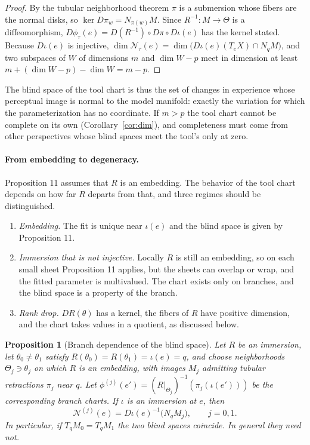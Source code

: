 \documentclass[11pt]{article}
\newtheorem{proposition}{Proposition}
\theoremstyle{remark}
\newcommand{\N}{\mathcal{N}}
\begin{document}
\begin{proof}
By the tubular neighborhood theorem $\pi$ is a submersion whose fibers are the normal disks, so $\ker D\pi_w=N_{\pi(w)}M$. Since $R^{-1}:M\to\Theta$ is a diffeomorphism, $D\phi_\tau(e)=D(R^{-1})\circ D\pi\circ D\iota(e)$ has the kernel stated. Because $D\iota(e)$ is injective, $\dim\N_\tau(e)=\dim\bigl(D\iota(e)(T_eX)\cap N_qM\bigr)$, and two subspaces of $W$ of dimensions $m$ and $\dim W-p$ meet in dimension at least $m+(\dim W-p)-\dim W=m-p$.
\end{proof}

The blind space of the tool chart is thus the set of changes in experience whose perceptual image is normal to the model manifold: exactly the variation for which the parameterization has no coordinate. If $m>p$ the tool chart cannot be complete on its own (Corollary~\ref{cor:dim}), and completeness must come from other perspectives whose blind spaces meet the tool's only at zero.

\paragraph{From embedding to degeneracy.} Proposition 11 assumes that $R$ is an embedding. The behavior of the tool chart depends on how far $R$ departs from that, and three regimes should be distinguished.
\begin{enumerate}[label=(\arabic*),nosep]
\item \emph{Embedding.} The fit is unique near $\iota(e)$ and the blind space is given by Proposition 11.
\item \emph{Immersion that is not injective.} Locally $R$ is still an embedding, so on each small sheet Proposition 11 applies, but the sheets can overlap or wrap, and the fitted parameter is multivalued. The chart exists only on branches, and the blind space is a property of the branch.
\item \emph{Rank drop.} $DR(\theta)$ has a kernel, the fibers of $R$ have positive dimension, and the chart takes values in a quotient, as discussed below.
\end{enumerate}

\begin{proposition}[Branch dependence of the blind space]\label{prop:branch}
Let $R$ be an immersion, let $\theta_0\neq\theta_1$ satisfy $R(\theta_0)=R(\theta_1)=\iota(e)=q$, and choose neighborhoods $\Theta_j\ni\theta_j$ on which $R$ is an embedding, with images $M_j$ admitting tubular retractions $\pi_j$ near $q$. Let $\phi^{(j)}(e')=(R|_{\Theta_j})^{-1}(\pi_j(\iota(e')))$ be the corresponding branch charts. If $\iota$ is an immersion at $e$, then
\[
\N^{(j)}(e)=D\iota(e)^{-1}\bigl(N_qM_j\bigr),\qquad j=0,1.
\]
In particular, if $T_qM_0=T_qM_1$ the two blind spaces coincide. In general they need not.
\end{proposition}
\end{document}
